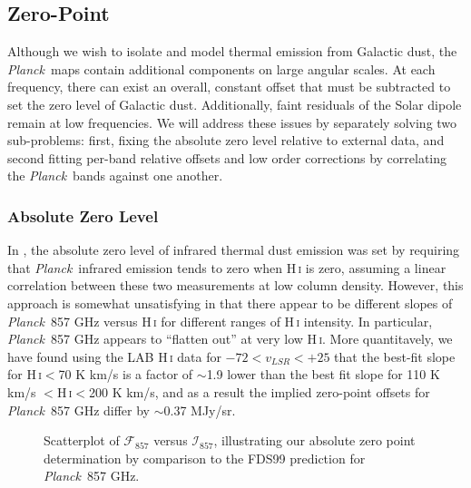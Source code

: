 \documentclass{emulateapj}
\newcommand{\PLANCK}{{\it Planck}}
\begin{document}
\subsection{Zero-Point}
\label{sec:zp}



Although we wish to isolate and model thermal emission from Galactic dust, the
\PLANCK~maps contain additional components on large angular scales. At each 
frequency, there can exist an overall, constant offset that must be subtracted 
to set the zero level of Galactic dust. Additionally, faint residuals of the 
Solar dipole remain at low frequencies. We will address these issues by
separately solving two sub-problems: first, fixing the absolute zero level 
relative to external data, and second fitting per-band relative offsets 
and low order corrections by correlating the \PLANCK~bands against one another.

\subsubsection{Absolute Zero Level}
\label{sec:zp_abs}
In \cite{planckdust}, the absolute zero level of infrared thermal dust emission
was set by requiring that \PLANCK~infrared emission tends to zero when 
H\,\textsc{i} is zero, assuming a linear correlation between these two 
measurements at low column density. However, this approach is somewhat
unsatisfying in that there appear to be different slopes of \PLANCK~857 GHz 
versus H\,\textsc{i} for different ranges of H\,\textsc{i} intensity. In 
particular, \PLANCK~857 GHz appears to ``flatten out'' at very low 
H\,\textsc{i}. More quantitavely, we have found using the LAB H\,\textsc{i} 
data \citep{lab} for $-72$$<$$v_{LSR}$$<$$+25$ that the best-fit slope for 
H\,\textsc{i}$<$70 K km/s is a factor of $\sim$1.9 lower than the best fit 
slope for 110 K km/s $<$H\,\textsc{i}$<$200 K km/s, and as a result the implied
zero-point offsets for \PLANCK~857 GHz differ by $\sim$0.37 MJy/sr.

\begin{figure}
\begin{center}
\caption{\label{fig:fdsref} Scatterplot of $\mathcal{F}_{857}$ versus 
$\mathcal{I}_{857}$, illustrating our absolute zero point determination by
comparison to the FDS99 prediction for \PLANCK~857 GHz.}
\end{center}
\end{figure}
\end{document}
